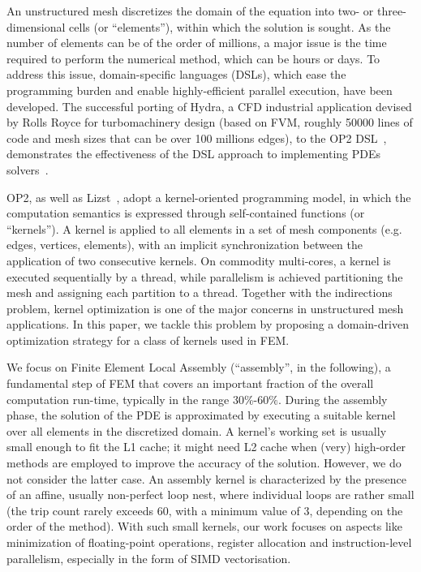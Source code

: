 \documentclass[conference]{IEEEtran}
\begin{document}
An unstructured mesh discretizes the domain of the equation into two- or three-dimensional cells (or ``elements''), within which the solution is sought. As the number of elements can be of the order of millions, a major issue is the time required to perform the numerical method, which can be hours or days. To address this issue, domain-specific languages (DSLs), which ease the programming burden and enable highly-efficient parallel execution, have been developed. The successful porting of Hydra, a CFD industrial application devised by Rolls Royce for turbomachinery design (based on FVM, roughly 50000 lines of code and mesh sizes that can be over 100 millions edges), to the OP2 DSL~\cite{pyop2ics}, demonstrates the effectiveness of the DSL approach to implementing PDEs solvers~\cite{OP2-hydra}. 

OP2, as well as Lizst~\cite{lizst}, adopt a kernel-oriented programming model, in which the computation semantics is expressed through self-contained functions (or ``kernels''). A kernel is applied to all elements in a set of mesh components (e.g. edges, vertices, elements), with an implicit synchronization between the application of two consecutive kernels. On commodity multi-cores, a kernel is executed sequentially by a thread, while parallelism is achieved partitioning the mesh and assigning each partition to a thread. Together with the indirections problem, kernel optimization is one of the major concerns in unstructured mesh applications. In this paper, we tackle this problem by proposing a domain-driven optimization strategy for a class of kernels used in FEM.

We focus on Finite Element Local Assembly (``assembly'', in the following), a fundamental step of FEM that covers an important fraction of the overall computation run-time, typically in the range 30$\%$-60$\%$. During the assembly phase, the solution of the PDE is approximated by executing a suitable kernel over all elements in the discretized domain. A kernel's working set is usually small enough to fit the L1 cache; it might need L2 cache when (very) high-order methods are employed to improve the accuracy of the solution. However, we do not consider the latter case. An assembly kernel is characterized by the presence of an affine, usually non-perfect loop nest, where individual loops are rather small (the trip count rarely exceeds 60, with a minimum value of 3, depending on the order of the method). With such small kernels, our work focuses on aspects like minimization of floating-point operations, register allocation and instruction-level parallelism, especially in the form of SIMD vectorisation. 
\end{document}

